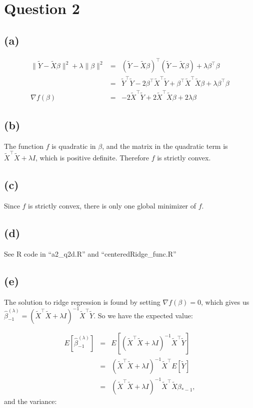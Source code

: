 \documentclass{article}\usepackage[]{graphicx}\usepackage[]{color}
\begin{document}
\section*{Question 2}
\subsection*{(a)}
\begin{eqnarray*}
  \|\tilde{Y}-\tilde{X}\beta\|^2 + \lambda\|\beta\|^2 &=& (\tilde{Y}-\tilde{X}\beta)^\top(\tilde{Y}-\tilde{X}\beta) + \lambda\beta^\top\beta \\
                 &=& \tilde{Y}^\top\tilde{Y} - 2\beta^\top\tilde{X}^\top\tilde{Y} + \beta^\top\tilde{X}^\top\tilde{X}\beta + \lambda\beta^\top\beta \\
 \nabla f(\beta) &=& -2\tilde{X}^\top\tilde{Y} + 2\tilde{X}^\top\tilde{X}\beta + 2\lambda\beta
\end{eqnarray*}

\subsection*{(b)}
The function $f$ is quadratic in $\beta$, and the matrix in the quadratic term is $\tilde{X}^\top\tilde{X}+\lambda I$, which is positive definite.  Therefore $f$ is strictly convex.

\subsection*{(c)}
Since $f$ is strictly convex, there is only one global minimizer of $f$.

\subsection*{(d)}
See R code in ``a2\_q2d.R'' and ``centeredRidge\_func.R''

\subsection*{(e)}
The solution to ridge regression is found by setting $\nabla f(\beta)=0$, which gives us $\hat{\beta}^{(\lambda)}_{-1}=(\tilde{X}^\top\tilde{X}+\lambda I)^{-1}\tilde{X}^\top\tilde{Y}$.  So we have the expected value:

\begin{eqnarray*}
  E[\hat{\beta}^{(\lambda)}_{-1}] &=& E[(\tilde{X}^\top\tilde{X}+\lambda I)^{-1}\tilde{X}^\top\tilde{Y}] \\
            &=& (\tilde{X}^\top\tilde{X}+\lambda I)^{-1}\tilde{X}^\top E[\tilde{Y}] \\
            &=&  (\tilde{X}^\top\tilde{X}+\lambda I)^{-1}\tilde{X}^\top\tilde{X}\beta_{*-1},
\end{eqnarray*}
and the variance:
\end{document}
